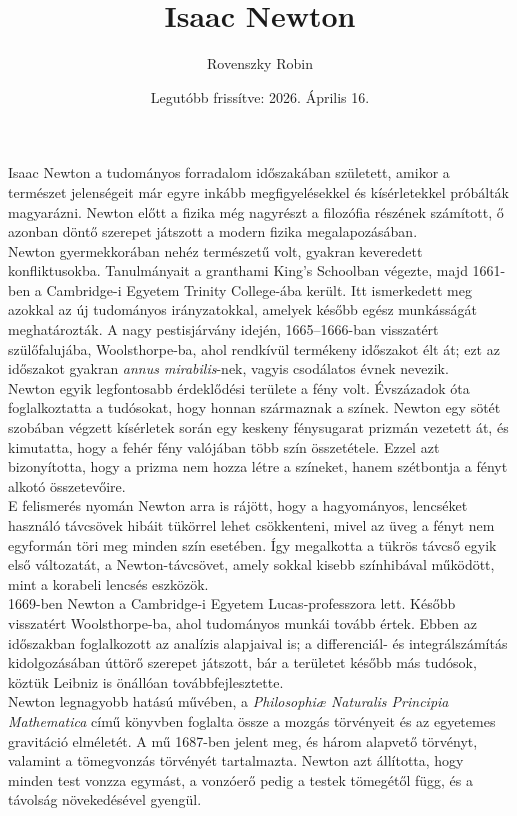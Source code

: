 \documentclass{article}
\title{Isaac Newton}
\author{Rovenszky Robin}
\date{Legutóbb frissítve: 2026. Április 16.}
\begin{document}
\maketitle

Isaac Newton a tudományos forradalom időszakában született, amikor a természet jelenségeit már egyre inkább megfigyelésekkel és kísérletekkel próbálták magyarázni. Newton előtt a fizika még nagyrészt a filozófia részének számított, ő azonban döntő szerepet játszott a modern fizika megalapozásában.\\

Newton gyermekkorában nehéz természetű volt, gyakran keveredett konfliktusokba. Tanulmányait a granthami King's Schoolban végezte, majd 1661-ben a Cambridge-i Egyetem Trinity College-ába került. Itt ismerkedett meg azokkal az új tudományos irányzatokkal, amelyek később egész munkásságát meghatározták. A nagy pestisjárvány idején, 1665--1666-ban visszatért szülőfalujába, Woolsthorpe-ba, ahol rendkívül termékeny időszakot élt át; ezt az időszakot gyakran \textit{annus mirabilis}-nek, vagyis csodálatos évnek nevezik.\\

Newton egyik legfontosabb érdeklődési területe a fény volt. Évszázadok óta foglalkoztatta a tudósokat, hogy honnan származnak a színek. Newton egy sötét szobában végzett kísérletek során egy keskeny fénysugarat prizmán vezetett át, és kimutatta, hogy a fehér fény valójában több szín összetétele. Ezzel azt bizonyította, hogy a prizma nem hozza létre a színeket, hanem szétbontja a fényt alkotó összetevőire.\\

E felismerés nyomán Newton arra is rájött, hogy a hagyományos, lencséket használó távcsövek hibáit tükörrel lehet csökkenteni, mivel az üveg a fényt nem egyformán töri meg minden szín esetében. Így megalkotta a tükrös távcső egyik első változatát, a Newton-távcsövet, amely sokkal kisebb színhibával működött, mint a korabeli lencsés eszközök.\\

1669-ben Newton a Cambridge-i Egyetem Lucas-professzora lett. Később visszatért Woolsthorpe-ba, ahol tudományos munkái tovább értek. Ebben az időszakban foglalkozott az analízis alapjaival is; a differenciál- és integrálszámítás kidolgozásában úttörő szerepet játszott, bár a területet később más tudósok, köztük Leibniz is önállóan továbbfejlesztette.\\

Newton legnagyobb hatású művében, a \textit{Philosophi\ae{} Naturalis Principia Mathematica} című könyvben foglalta össze a mozgás törvényeit és az egyetemes gravitáció elméletét. A mű 1687-ben jelent meg, és három alapvető törvényt, valamint a tömegvonzás törvényét tartalmazta. Newton azt állította, hogy minden test vonzza egymást, a vonzóerő pedig a testek tömegétől függ, és a távolság növekedésével gyengül.\\
\end{document}

